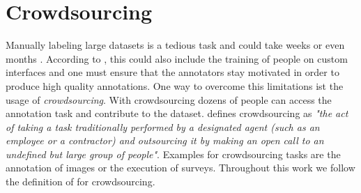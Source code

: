 \section{Crowdsourcing}
\label{chp:fundamentals:sec:crowdsourcing}
Manually labeling large datasets is a tedious task and could take weeks or even months \parencite{Welinder:2010}.
According to \textcite{Welinder:2010}, this could also include the training of people on custom interfaces and one must ensure that the annotators stay motivated in order to produce high quality annotations.
One way to overcome this limitations ist the usage of \textit{crowdsourcing}.
With crowdsourcing dozens of people can access the annotation task and contribute to the dataset.
\textcite{Howe:2008} defines crowdsourcing as \textit{"the act of taking a task traditionally performed by a designated agent (such as an employee or a contractor) and outsourcing it by making an open call to an undefined but large group of people"}.
Examples for crowdsourcing tasks are the annotation of images or the execution of surveys.
Throughout this work we follow the definition of \textcite{Howe:2008} for crowdsourcing.
